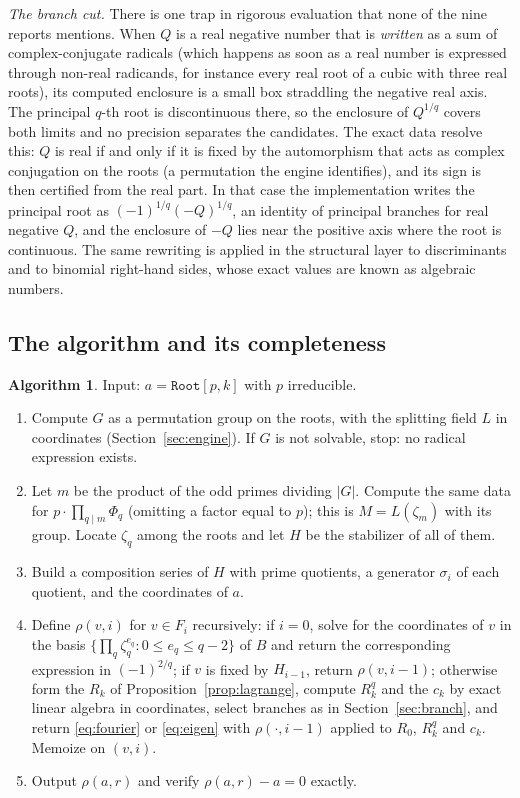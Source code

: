 \documentclass[11pt,a4paper]{article}
\theoremstyle{definition}
\newtheorem{algorithm}[theorem]{Algorithm}
\theoremstyle{remark}
\newcommand{\code}[1]{\texttt{#1}}
\newcommand{\Root}{\code{Root}}
\begin{document}
\emph{The branch cut.}  There is one trap in rigorous evaluation that none of the nine
reports mentions.  When $Q$ is a real negative number that is \emph{written} as a sum of
complex-conjugate radicals (which happens as soon as a real number is expressed through
non-real radicands, for instance every real root of a cubic with three real roots), its
computed enclosure is a small box straddling the negative real axis.  The principal
$q$-th root is discontinuous there, so the enclosure of $Q^{1/q}$ covers both limits and
no precision separates the candidates.  The exact data resolve this: $Q$ is real if and
only if it is fixed by the automorphism that acts as complex conjugation on the roots (a
permutation the engine identifies), and its sign is then certified from the real part.
In that case the implementation writes the principal root as $(-1)^{1/q}(-Q)^{1/q}$,
an identity of principal branches for real negative $Q$, and the enclosure of $-Q$ lies
near the positive axis where the root is continuous.  The same rewriting is applied in
the structural layer to discriminants and to binomial right-hand sides, whose exact
values are known as algebraic numbers.

\subsection{The algorithm and its completeness}

\begin{algorithm}\label{alg:descent}
Input: $a=\Root[p,k]$ with $p$ irreducible.
\begin{enumerate}[nosep]
\item Compute $G$ as a permutation group on the roots, with the splitting field $L$ in
coordinates (Section~\ref{sec:engine}).  If $G$ is not solvable, stop: no radical
expression exists.
\item Let $m$ be the product of the odd primes dividing $|G|$.  Compute the same data for
$p\cdot\prod_{q\mid m}\Phi_q$ (omitting a factor equal to $p$); this is $M=L(\zeta_m)$
with its group.  Locate $\zeta_q$ among the roots and let $H$ be the stabilizer of all of
them.
\item Build a composition series of $H$ with prime quotients, a generator $\sigma_i$ of
each quotient, and the coordinates of $a$.
\item Define $\rho(v,i)$ for $v\in F_i$ recursively: if $i=0$, solve for the coordinates of
$v$ in the basis $\{\prod_q\zeta_q^{e_q}:0\le e_q\le q-2\}$ of $B$ and return the
corresponding expression in $(-1)^{2/q}$; if $v$ is fixed by $H_{i-1}$, return
$\rho(v,i-1)$; otherwise form the $R_k$ of Proposition~\ref{prop:lagrange}, compute
$R_k^q$ and the $c_k$ by exact linear algebra in coordinates, select branches as in
Section~\ref{sec:branch}, and return \eqref{eq:fourier} or \eqref{eq:eigen} with
$\rho(\cdot,i-1)$ applied to $R_0$, $R_k^q$ and $c_k$.  Memoize on $(v,i)$.
\item Output $\rho(a,r)$ and verify $\rho(a,r)-a=0$ exactly.
\end{enumerate}
\end{algorithm}
\end{document}
